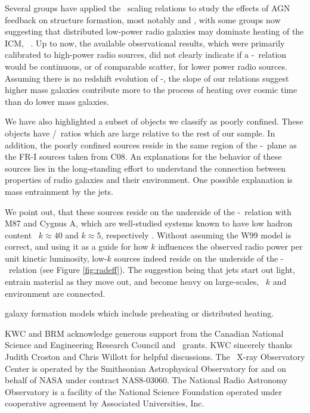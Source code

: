 \documentclass{emulateapj}
\begin{document}
Several groups have applied the \birzan\ scaling relations to study
the effects of AGN feedback on structure formation, most notably
\citet{best07} and \citet{2007MNRAS.379..260M}, with some groups now
suggesting that distributed low-power radio galaxies may dominate
heating of the ICM, \eg\ \citet{2009arXiv0908.3158H}. Up to now, the
available observational results, which were primarily calibrated to
high-power radio sources, did not clearly indicate if a
\pjet-\prad\ relation would be continuous, or of comparable scatter,
for lower power radio sources. Assuming there is no redshift evolution
of \pjet-\prad, the slope of our relations suggest higher mass
galaxies contribute more to the process of heating over cosmic time
than do lower mass galaxies.

We have also highlighted a subset of objects we classify as poorly
confined. These objects have \pjet/\prad\ ratios which are large
relative to the rest of our sample. In addition, the poorly confined
sources reside in the same region of the \pjet-\prad\ plane as the
FR-I sources taken from C08. An explanations for the behavior of these
sources lies in the long-standing effort to understand the connection
between properties of radio galaxies and their environment. One
possible explanation is mass entrainment by the jets.

We point out, that these sources reside on the underside of the
\pjet-\prad\ relation with M87 and Cygnus A, which are well-studied
systems known to have low hadron content \eg\ $k \approx 40$ and $k
\approx 5$, respectively \citep{birzan08}. Without assuming the W99
model is correct, and using it as a guide for how $k$ influences the
observed radio power per unit kinetic luminosity, low-$k$ sources
indeed reside on the underside of the \pjet-\prad\ relation (see
Figure \ref{fig:radeff}). The suggestion being that jets start out
light, entrain material as they move out, and become heavy on
large-scales, \eg\ $k$ and environment are connected.

galaxy formation models which include preheating or
  distributed heating.

\acknowledgements

KWC and BRM acknowledge generous support from the Canadian National
Science and Engineering Research Council and \cxo\ grants. KWC
sincerely thanks Judith Croston and Chris Willott for helpful
discussions. The \chandra\ X-ray Observatory Center is operated by the
Smithsonian Astrophysical Observatory for and on behalf of NASA under
contract NAS8-03060. The National Radio Astronomy Observatory is a
facility of the National Science Foundation operated under cooperative
agreement by Associated Universities, Inc.
\end{document}
